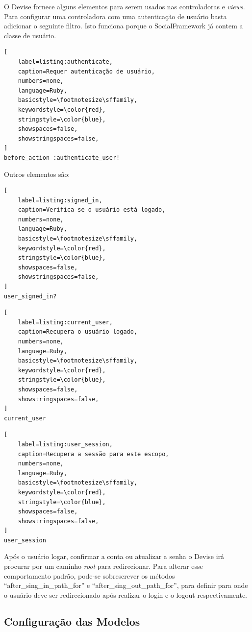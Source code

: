 O Devise fornece alguns elementos para serem usados nas controladoras e \textit{views}. Para configurar uma controladora com uma autenticação de usuário basta adicionar o seguinte filtro. Isto funciona porque o SocialFramework já contem a classe de usuário.

\begin{lstlisting}[
    label=listing:authenticate,
    caption=Requer autenticação de usuário,
    numbers=none,
    language=Ruby,
    basicstyle=\footnotesize\sffamily,
    keywordstyle=\color{red},
    stringstyle=\color{blue},
    showspaces=false,
    showstringspaces=false,
]
before_action :authenticate_user!
\end{lstlisting}

Outros elementos são:

\begin{lstlisting}[
    label=listing:signed_in,
    caption=Verifica se o usuário está logado,
    numbers=none,
    language=Ruby,
    basicstyle=\footnotesize\sffamily,
    keywordstyle=\color{red},
    stringstyle=\color{blue},
    showspaces=false,
    showstringspaces=false,
]
user_signed_in?
\end{lstlisting}

\begin{lstlisting}[
    label=listing:current_user,
    caption=Recupera o usuário logado,
    numbers=none,
    language=Ruby,
    basicstyle=\footnotesize\sffamily,
    keywordstyle=\color{red},
    stringstyle=\color{blue},
    showspaces=false,
    showstringspaces=false,
]
current_user
\end{lstlisting}

\begin{lstlisting}[
    label=listing:user_session,
    caption=Recupera a sessão para este escopo,
    numbers=none,
    language=Ruby,
    basicstyle=\footnotesize\sffamily,
    keywordstyle=\color{red},
    stringstyle=\color{blue},
    showspaces=false,
    showstringspaces=false,
]
user_session
\end{lstlisting}

Após o usuário logar, confirmar a conta ou atualizar a senha o Devise irá procurar por um caminho \textit{root} para redirecionar. Para alterar esse comportamento padrão, pode-se sobrescrever os métodos ``after\_sing\_in\_path\_for'' e ``after\_sing\_out\_path\_for'', para definir para onde o usuário deve ser redirecionado após realizar o login e o logout respectivamente.

\subsection{Configuração das Modelos}
\label{configuracao_das_modelos}

